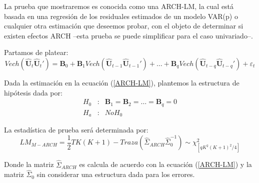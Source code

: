 \documentclass[
  a4paper,
]{article}
\begin{document}
La prueba que mostraremos es conocida como una ARCH-LM, la cual está
basada en una regresión de los residuales estimados de un modelo VAR(p)
o cualquier otra estimación que deseemos probar, con el objeto de
determinar si existen efectos ARCH --esta prueba se puede simplificar
para el caso univariado--.

Partamos de platear: \[
    Vech(\hat{\mathbf{U}}_t \hat{\mathbf{U}}_t') = \mathbf{B}_0 + \mathbf{B}_1 Vech(\hat{\mathbf{U}}_{t-1} \hat{\mathbf{U}}_{t-1}') + \ldots + \mathbf{B}_q Vech(\hat{\mathbf{U}}_{t-q} \hat{\mathbf{U}}_{t-q}') + \varepsilon_t
    \label{ARCH-LM}
\]

Dada la estimación en la ecuación (\ref{ARCH-LM}), plantemos la
estructura de hipótesis dada por: \begin{eqnarray*}
    H_0 & : & \mathbf{B}_1 = \mathbf{B}_2 = \ldots = \mathbf{B}_q = 0 \\
    H_a & : & No H_0    
\end{eqnarray*}

La estadística de prueba será determinada por: \[
    LM_{M-ARCH} = \frac{1}{2} T K (K + 1) - Traza \left( \hat{\Sigma}_{ARCH} \hat{\Sigma}^{-1}_{0} \right) \sim \chi^2_{[q K^2 (K + 1)^2 / 4]}
\]

Donde la matriz \(\hat{\Sigma}_{ARCH}\) es calcula de acuerdo con la
ecuación (\ref{ARCH-LM}) y la matriz \(\hat{\Sigma}_{0}\) sin considerar
una estructura dada para los errores.


\printbibliography
\end{document}
